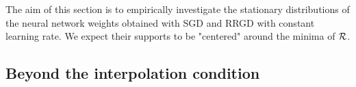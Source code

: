 \documentclass[article,authoryear,jmlmc]{beg_32}             %
\begin{document}
The aim of this section is to empirically investigate the stationary distributions of the neural network weights obtained with SGD and RRGD with constant learning rate. 
We expect their supports to be "centered" around the minima of $\mathcal{R}$. 

\subsection{Beyond the interpolation condition}
\label{subsection_beyond_interpolation}

\end{document}
